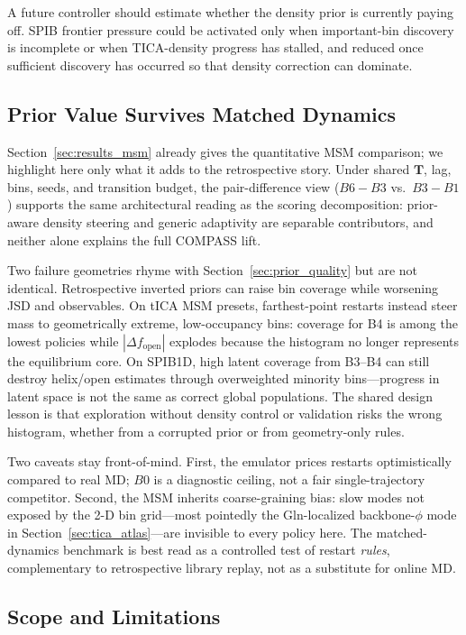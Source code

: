 \documentclass[journal=jctcce,manuscript=article,layout=twocolumn]{achemso}
\begin{document}
A future controller should estimate whether the density prior is currently paying off. SPIB frontier pressure could be activated only when important-bin discovery is incomplete or when TICA-density progress has stalled, and reduced once sufficient discovery has occurred so that density correction can dominate.

\subsection{Prior Value Survives Matched Dynamics}
\label{sec:disc_msm}

Section~\ref{sec:results_msm} already gives the quantitative MSM comparison; we highlight here only what it adds to the retrospective story. Under shared $\mathbf{T}$, lag, bins, seeds, and transition budget, the pair-difference view ($B6{-}B3$ vs.\ $B3{-}B1$) supports the same architectural reading as the scoring decomposition: prior-aware density steering and generic adaptivity are separable contributors, and neither alone explains the full COMPASS lift.

Two failure geometries rhyme with Section~\ref{sec:prior_quality} but are not identical. Retrospective inverted priors can raise bin coverage while worsening JSD and observables. On tICA MSM presets, farthest-point restarts instead steer mass to geometrically extreme, low-occupancy bins: coverage for B4 is among the lowest policies while $|\Delta f_{\mathrm{open}}|$ explodes because the histogram no longer represents the equilibrium core. On SPIB1D, high latent coverage from B3--B4 can still destroy helix/open estimates through overweighted minority bins---progress in latent space is not the same as correct global populations. The shared design lesson is that exploration without density control or validation risks the wrong histogram, whether from a corrupted prior or from geometry-only rules.

Two caveats stay front-of-mind. First, the emulator prices restarts optimistically compared to real MD; $B0$ is a diagnostic ceiling, not a fair single-trajectory competitor. Second, the MSM inherits coarse-graining bias: slow modes not exposed by the 2-D bin grid---most pointedly the Gln-localized backbone-$\phi$ mode in Section~\ref{sec:tica_atlas}---are invisible to every policy here. The matched-dynamics benchmark is best read as a controlled test of restart \emph{rules}, complementary to retrospective library replay, not as a substitute for online MD.

\subsection{Scope and Limitations}
\end{document}

